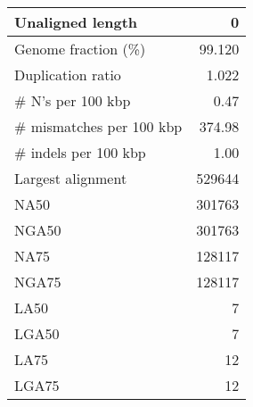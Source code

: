 \documentclass[12pt,a4paper]{article}
\begin{document}
\begin{table}[ht]
\begin{center}
\begin{tabular}{|l*{1}{|r}|}
Unaligned length & 0 \\ \hline
Genome fraction (\%) & 99.120 \\ \hline
Duplication ratio & 1.022 \\ \hline
\# N's per 100 kbp & 0.47 \\ \hline
\# mismatches per 100 kbp & 374.98 \\ \hline
\# indels per 100 kbp & 1.00 \\ \hline
Largest alignment & 529644 \\ \hline
NA50 & 301763 \\ \hline
NGA50 & 301763 \\ \hline
NA75 & 128117 \\ \hline
NGA75 & 128117 \\ \hline
LA50 & 7 \\ \hline
LGA50 & 7 \\ \hline
LA75 & 12 \\ \hline
LGA75 & 12 \\ \hline
\end{tabular}
\end{center}
\end{table}
\end{document}
